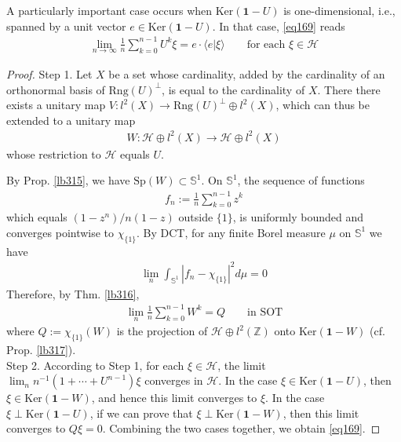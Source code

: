 \documentclass[12pt,b5paper,notitlepage]{article}
\theoremstyle{definition}
\theoremstyle{plain}
\newcommand{\idt}{\mathbf{1}}
\newcommand{\bk}[1]{\langle {#1}\rangle}
\newcommand{\Zbb}{\mathbb Z}
\newcommand{\Ker}{\mathrm{Ker}}
\newcommand{\Sp}{\mathrm{Sp}}
\newcommand{\Rng}{\mathrm{Rng}}
\newcommand{\Sbb}{{\mathbb S}}
\newcommand{\MH}{\mathcal H}
\numberwithin{equation}{section}
\begin{document}
A particularly important case occurs when $\Ker(\idt-U)$ is one-dimensional, i.e., spanned by a unit vector $e\in\Ker(\idt-U)$. In that case, \eqref{eq169} reads
\begin{align}
\lim_{n\rightarrow\infty}\frac 1{n}\sum_{k=0}^{n-1}U^k\xi=e\cdot\bk{e|\xi}\qquad\text{for each }\xi\in\MH
\end{align}

\begin{proof}
Step 1. Let $X$ be a set whose cardinality, added by the cardinality of an orthonormal basis of $\Rng(U)^\perp$, is equal to the cardinality of $X$. There there exists a unitary map $V:l^2(X)\rightarrow \Rng(U)^\perp\oplus l^2(X)$, which can thus be extended to a unitary map
\begin{align*}
W: \MH\oplus l^2(X)\rightarrow\MH\oplus l^2(X)
\end{align*}
whose restriction to $\MH$ equals $U$. 

By Prop. \ref{lb315}, we have $\Sp(W)\subset\Sbb^1$. On $\Sbb^1$, the sequence of functions
\begin{align*}
f_n:=\frac 1n\sum_{k=0}^{n-1}z^k
\end{align*}
which equals $(1-z^n)/n(1-z)$ outside $\{1\}$, is uniformly bounded and converges pointwise to $\chi_{\{1\}}$. By DCT, for any finite Borel measure $\mu$ on $\Sbb^1$ we have
\begin{align*}
\lim_n\int_{\Sbb^1}|f_n-\chi_{\{1\}}|^2d\mu=0
\end{align*}
Therefore, by Thm. \ref{lb316}, 
\begin{align*}
\lim_n\frac 1{n}\sum_{k=0}^{n-1}W^k=Q\qquad\text{in SOT}
\end{align*}
where $Q:=\chi_{\{1\}}(W)$ is the projection of $\MH\oplus l^2(\Zbb)$ onto $\Ker(\idt-W)$ (cf. Prop. \ref{lb317}).\\[-1ex]

Step 2. According to Step 1, for each $\xi\in\MH$, the limit $\lim_n n^{-1}(1+\cdots +U^{n-1})\xi$ converges in $\MH$. In the case  $\xi\in\Ker(\idt-U)$, then $\xi\in\Ker(\idt-W)$, and hence this limit converges to $\xi$. In the case $\xi\perp\Ker(\idt-U)$, if we can prove that $\xi\perp\Ker(\idt-W)$, then this limit converges to $Q\xi=0$. Combining the two cases together, we obtain \eqref{eq169}.


\end{proof}
\end{document}
